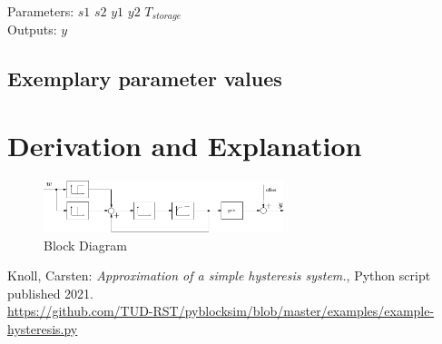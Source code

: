 \documentclass[10pt,a4paper]{article}
\begin{document}
	\noindent
	Parameters: $s1$ $s2$ $y1$ $y2$ $T_{storage}$%
	\\
	Outputs: $y$ %
	
	
	
	\subsection{Exemplary parameter values}
	

	
	\section{Derivation and Explanation} %
	\begin{figure}[H]
		\centering
		\includegraphics[width=70mm]{hysteresis.pdf}
		\caption{Block Diagram}
	\end{figure}
	
	
	
	\begin{thebibliography}{10}		
		Knoll, Carsten: 
		\textit{Approximation of a simple hysteresis system.}, Python script published 2021. \\
		\url{https://github.com/TUD-RST/pyblocksim/blob/master/examples/example-hysteresis.py}
	\end{thebibliography}
\end{document}
